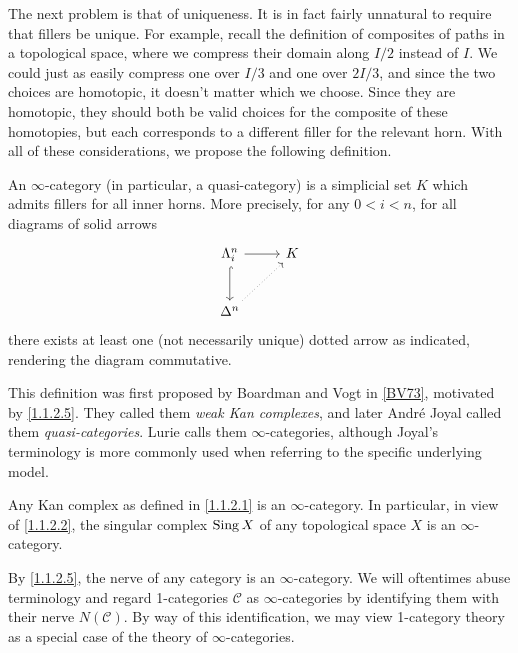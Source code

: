 The next problem is that of uniqueness. It is in fact fairly unnatural to require that fillers be unique. For example, recall the definition of composites of paths in a topological space, where we compress their domain along $I /2$ instead of $I$. We could just as easily compress one over $I /3$ and one over $2 I/3$, and since the two choices are homotopic, it doesn't matter which we choose. Since they are homotopic, they should both be valid choices for the composite of these homotopies, but each corresponds to a different filler for the relevant horn. With all of these considerations, we propose the following definition.

\begin{definition}\label{1.1.2.8}
	An $\infty $-category (in particular, a quasi-category) is a simplicial set $K$ which admits fillers for all inner horns. More precisely, for any $0<i<n$, for all diagrams of solid arrows
	\[\begin{tikzcd}[row sep = 2.5em, column sep = 2.5em]
	\Lambda_i^n \ar[r] \ar[hook, d]  & K \\
	\Delta^n \ar[dotted, ur]  & 
	\end{tikzcd}\]
	there exists at least one (not necessarily unique) dotted arrow as indicated, rendering the diagram commutative.
\end{definition}

This definition was first proposed by Boardman and Vogt in \cref{BV73}, motivated by \cref{1.1.2.5}. They called them \emph{weak Kan complexes}, and later Andr\'e Joyal called them \emph{quasi-categories}. Lurie calls them $\infty $-categories, although Joyal's terminology is more commonly used when referring to the specific underlying model.

\begin{example}\label{1.1.2.9}
	Any Kan complex as defined in \cref{1.1.2.1} is an $\infty $-category. In particular, in view of \cref{1.1.2.2}, the singular complex $\operatorname{Sing} X$ of any topological space $X$ is an $\infty $-category.
\end{example}
\begin{example}\label{1.1.2.10}
	By \cref{1.1.2.5}, the nerve of any category is an $\infty $-category. We will oftentimes abuse terminology and regard 1-categories $\mathcal{C} $ as $\infty $-categories by identifying them with their nerve $N(\mathcal{C})$. By way of this identification, we may view 1-category theory as a special case of the theory of $\infty $-categories.
\end{example}

